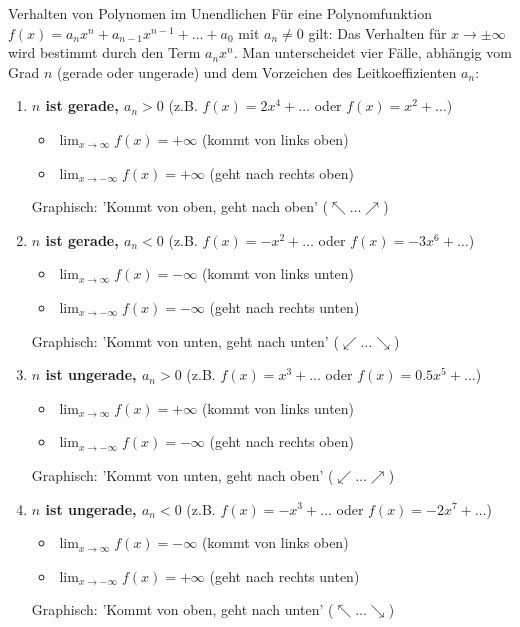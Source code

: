 \begin{merksatzumgebung}{Verhalten von Polynomen im Unendlichen}
Für eine Polynomfunktion $f(x) = a_n x^n + a_{n-1}x^{n-1} + \dots + a_0$ mit $a_n \neq 0$ gilt:
Das Verhalten für $x \to \pm \infty$ wird bestimmt durch den Term $a_n x^n$.
Man unterscheidet vier Fälle, abhängig vom Grad $n$ (gerade oder ungerade) und dem Vorzeichen des Leitkoeffizienten $a_n$:

\begin{enumerate}
    \item \textbf{$n$ ist gerade, $a_n > 0$} (z.B. $f(x) = 2x^4 + \dots$ oder $f(x)=x^2+\dots$)
        \begin{itemize}
            \item $\lim_{x \to \infty} f(x) = +\infty$ (kommt von links oben)
            \item $\lim_{x \to -\infty} f(x) = +\infty$ (geht nach rechts oben)
        \end{itemize}
        Graphisch: 'Kommt von oben, geht nach oben' ($\nwarrow \dots \nearrow$)

    \item \textbf{$n$ ist gerade, $a_n < 0$} (z.B. $f(x) = -x^2 + \dots$ oder $f(x)=-3x^6+\dots$)
        \begin{itemize}
            \item $\lim_{x \to \infty} f(x) = -\infty$ (kommt von links unten)
            \item $\lim_{x \to -\infty} f(x) = -\infty$ (geht nach rechts unten)
        \end{itemize}
        Graphisch: 'Kommt von unten, geht nach unten' ($\swarrow \dots \searrow$)

    \item \textbf{$n$ ist ungerade, $a_n > 0$} (z.B. $f(x) = x^3 + \dots$ oder $f(x)=0.5x^5+\dots$)
        \begin{itemize}
            \item $\lim_{x \to \infty} f(x) = +\infty$ (kommt von links unten)
            \item $\lim_{x \to -\infty} f(x) = -\infty$ (geht nach rechts oben)
        \end{itemize}
        Graphisch: 'Kommt von unten, geht nach oben' ($\swarrow \dots \nearrow$)

    \item \textbf{$n$ ist ungerade, $a_n < 0$} (z.B. $f(x) = -x^3 + \dots$ oder $f(x)=-2x^7+\dots$)
        \begin{itemize}
            \item $\lim_{x \to \infty} f(x) = -\infty$ (kommt von links oben)
            \item $\lim_{x \to -\infty} f(x) = +\infty$ (geht nach rechts unten)
        \end{itemize}
        Graphisch: 'Kommt von oben, geht nach unten' ($\nwarrow \dots \searrow$)
\end{enumerate}
\end{merksatzumgebung}


